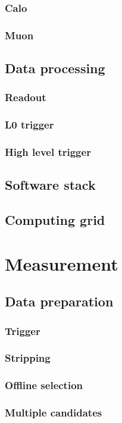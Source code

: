 \subsection{Calo}
\subsection{Muon}
\section{Data processing}
\subsection{Readout}
\subsection{L0 trigger}
\subsection{High level trigger}
\section{Software stack}
\section{Computing grid}

\chapter{Measurement}
\section{Data preparation}
\subsection{Trigger}
\subsection{Stripping}
\subsection{Offline selection}
\subsection{Multiple candidates}
